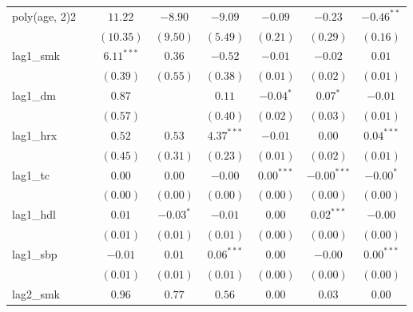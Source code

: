 \begin{tabular}{l c c c c c c c}
poly(age, 2)2        &               & $11.22$       & $-8.90$     & $-9.09$       & $-0.09$       & $-0.23$       & $-0.46^{**}$  \\
                     &               & $(10.35)$     & $(9.50)$    & $(5.49)$      & $(0.21)$      & $(0.29)$      & $(0.16)$      \\
lag1\_smk            &               & $6.11^{***}$  & $0.36$      & $-0.52$       & $-0.01$       & $-0.02$       & $0.01$        \\
                     &               & $(0.39)$      & $(0.55)$    & $(0.38)$      & $(0.01)$      & $(0.02)$      & $(0.01)$      \\
lag1\_dm             &               & $0.87$        &             & $0.11$        & $-0.04^{*}$   & $0.07^{*}$    & $-0.01$       \\
                     &               & $(0.57)$      &             & $(0.40)$      & $(0.02)$      & $(0.03)$      & $(0.01)$      \\
lag1\_hrx            &               & $0.52$        & $0.53$      & $4.37^{***}$  & $-0.01$       & $0.00$        & $0.04^{***}$  \\
                     &               & $(0.45)$      & $(0.31)$    & $(0.23)$      & $(0.01)$      & $(0.02)$      & $(0.01)$      \\
lag1\_tc             &               & $0.00$        & $0.00$      & $-0.00$       & $0.00^{***}$  & $-0.00^{***}$ & $-0.00^{*}$   \\
                     &               & $(0.00)$      & $(0.00)$    & $(0.00)$      & $(0.00)$      & $(0.00)$      & $(0.00)$      \\
lag1\_hdl            &               & $0.01$        & $-0.03^{*}$ & $-0.01$       & $0.00$        & $0.02^{***}$  & $-0.00$       \\
                     &               & $(0.01)$      & $(0.01)$    & $(0.01)$      & $(0.00)$      & $(0.00)$      & $(0.00)$      \\
lag1\_sbp            &               & $-0.01$       & $0.01$      & $0.06^{***}$  & $0.00$        & $-0.00$       & $0.00^{***}$  \\
                     &               & $(0.01)$      & $(0.01)$    & $(0.01)$      & $(0.00)$      & $(0.00)$      & $(0.00)$      \\
lag2\_smk            &               & $0.96$        & $0.77$      & $0.56$        & $0.00$        & $0.03$        & $0.00$        \\

\end{tabular}

